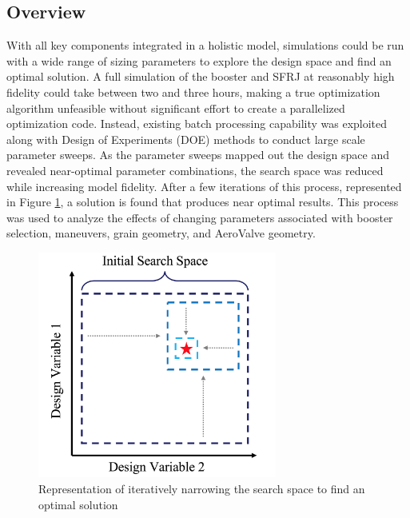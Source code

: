 \subsection{Overview}

With all key components integrated in a holistic model, simulations could be run with a wide range of sizing parameters to explore the design space and find an optimal solution. A full simulation of the booster and SFRJ at reasonably high fidelity could take between two and three hours, making a true optimization algorithm unfeasible without significant effort to create a parallelized optimization code. Instead, existing batch processing capability was exploited along with Design of Experiments (DOE) methods to conduct large scale parameter sweeps. As the parameter sweeps mapped out the design space and revealed near-optimal parameter combinations, the search space was reduced while increasing model fidelity. After a few iterations of this process, represented in Figure \ref{fig:searchSpace}, a solution is found that produces near optimal results. This process was used to analyze the effects of changing parameters associated with booster selection, maneuvers, grain geometry, and AeroValve geometry. 

\begin{figure}[H]
    \centering
    \includegraphics[width=0.7\textwidth]{ParameterSweeps/figures/searchSpace.png}
    \caption{Representation of iteratively narrowing the search space to find an optimal solution}
    \label{fig:searchSpace}
\end{figure}

